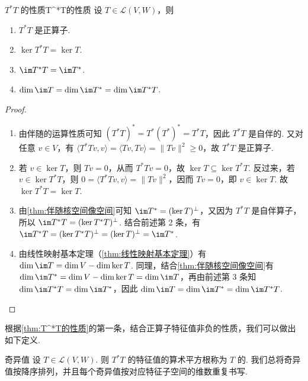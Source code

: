 \begin{theorem}{$T^*T$ 的性质}{T^*T的性质}
    设 $T \in \mathcal{L}(V, W)$，则
    \begin{enumerate}
        \item $T^*T$ 是正算子.

        \item $\ker T^*T = \ker T$.

        \item $\im T^*T = \im T^*$.

        \item $\dim \im T = \dim \im T^* = \dim \im T^*T$.
    \end{enumerate}
\end{theorem}

\begin{proof}
    \begin{enumerate}
        \item 由伴随的运算性质可知 $(T^*T)^* = T^*(T^*)^* = T^*T$，因此 $T^*T$ 是自伴的. 又对任意 $v \in V$，有 $\langle T^*Tv, v \rangle = \langle Tv, Tv \rangle = \lVert Tv \rVert^2 \geqslant 0$，故 $T^*T$ 是正算子.

        \item 若 $v \in \ker T$，则 $Tv = 0$，从而 $T^*Tv = 0$，故 $\ker T \subseteq \ker T^*T$. 反过来，若 $v \in \ker T^*T$，则 $0 = \langle T^*Tv, v \rangle = \lVert Tv \rVert^2$，因而 $Tv = 0$，即 $v \in \ker T$. 故 $\ker T^*T = \ker T$.

        \item 由\autoref{thm:伴随核空间像空间}可知 $\im T^* = (\ker T)^{\perp}$，又因为 $T^*T$ 是自伴算子，所以 $\im T^*T = (\ker T^*T)^{\perp}$. 结合前述第 2 条，有 $\im T^*T = (\ker T^*T)^{\perp} = (\ker T)^{\perp} = \im T^*$.

        \item 由线性映射基本定理（\autoref{thm:线性映射基本定理}）有 $\dim \im T = \dim V - \dim \ker T$. 同理，结合\autoref{thm:伴随核空间像空间}有 $\dim \im T^* = \dim V - \dim \ker T = \dim \im T$，再由前述第 3 条知 $\dim \im T^*T = \dim \im T^*$，因此 $\dim \im T = \dim \im T^* = \dim \im T^*T$.
    \end{enumerate}
\end{proof}

根据\autoref{thm:T^*T的性质}的第一条，结合正算子特征值非负的性质，我们可以做出如下定义.

\begin{definition}{奇异值}{} 
    设 $T \in \mathcal{L}(V, W)$. 则 $T^*T$ 的特征值的算术平方根称为 $T$ 的. 我们总将奇异值按降序排列，并且每个奇异值按对应特征子空间的维数重复书写.
\end{definition}

